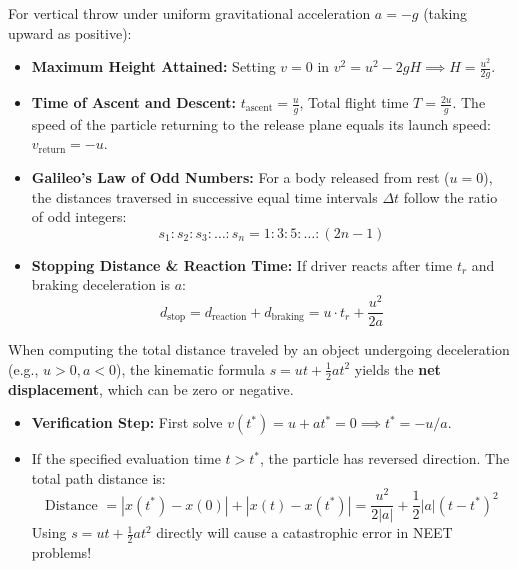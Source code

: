 \documentclass[10pt,a4paper]{article}
\begin{document}
\begin{usecasebox}
For vertical throw under uniform gravitational acceleration $a = -g$ (taking upward as positive):
\begin{itemize}
  \item \textbf{Maximum Height Attained:} Setting $v = 0$ in $v^2 = u^2 - 2gH \implies H = \frac{u^2}{2g}$.
  \item \textbf{Time of Ascent and Descent:} $t_{\text{ascent}} = \frac{u}{g}$, Total flight time $T = \frac{2u}{g}$. The speed of the particle returning to the release plane equals its launch speed: $v_{\text{return}} = -u$.
  \item \textbf{Galileo's Law of Odd Numbers:} For a body released from rest ($u=0$), the distances traversed in successive equal time intervals $\Delta t$ follow the ratio of odd integers:
  \begin{equation}
    s_1 : s_2 : s_3 : \dots : s_n = 1 : 3 : 5 : \dots : (2n - 1)
  \end{equation}
  \item \textbf{Stopping Distance \& Reaction Time:} If driver reacts after time $t_r$ and braking deceleration is $a$:
  \begin{equation}
    d_{\text{stop}} = d_{\text{reaction}} + d_{\text{braking}} = u \cdot t_r + \frac{u^2}{2a}
  \end{equation}
\end{itemize}
\end{usecasebox}

\begin{trapbox}
When computing the total distance traveled by an object undergoing deceleration (e.g., $u > 0, a < 0$), the kinematic formula $s = ut + \frac{1}{2}at^2$ yields the \textbf{net displacement}, which can be zero or negative.
\begin{itemize}
  \item \textbf{Verification Step:} First solve $v(t^*) = u + at^* = 0 \implies t^* = -u/a$.
  \item If the specified evaluation time $t > t^*$, the particle has reversed direction. The total path distance is:
  \begin{equation}
    \text{Distance } = |x(t^*) - x(0)| + |x(t) - x(t^*)| = \frac{u^2}{2|a|} + \frac{1}{2}|a|(t - t^*)^2
  \end{equation}
  Using $s = ut + \frac{1}{2}at^2$ directly will cause a catastrophic error in NEET problems!
\end{itemize}
\end{trapbox}
\end{document}
